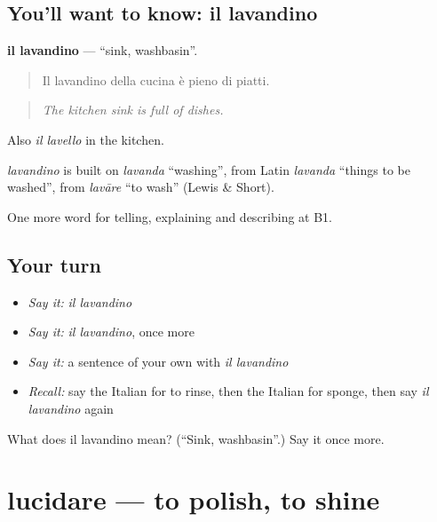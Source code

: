 \subsection*{You'll want to know: il lavandino}
\textbf{il lavandino} — \textquotedblleft{}sink, washbasin\textquotedblright{}.

\begin{quote}
Il lavandino della cucina è pieno di piatti.
\end{quote}

\begin{quote}
\emph{The kitchen sink is full of dishes.}
\end{quote}

Also \emph{il lavello} in the kitchen.

\begin{cousinweb}
\emph{lavandino} is built on \emph{lavanda} \textquotedblleft{}washing\textquotedblright{}, from Latin \emph{lavanda} \textquotedblleft{}things to be washed\textquotedblright{}, from \emph{lavāre} \textquotedblleft{}to wash\textquotedblright{} (Lewis \& Short).
\end{cousinweb}

\begin{grammarlens}[title={What you've built}]
One more word for telling, explaining and describing at B1.
\end{grammarlens}

\subsection*{Your turn}
\begin{itemize}
\raggedright
  \item \emph{Say it:} \emph{il lavandino}
  \item \emph{Say it:} \emph{il lavandino}, once more
  \item \emph{Say it:} a sentence of your own with \emph{il lavandino}
  \item \emph{Recall:} say the Italian for to rinse, then the Italian for sponge, then say \emph{il lavandino} again
\end{itemize}

\begin{tcolorbox}[breakable,colback=teal!4,colframe=teal!35!black,title={Before you move on}]
What does il lavandino mean? (\textquotedblleft{}Sink, washbasin\textquotedblright{}.) Say it once more.
\end{tcolorbox}
\section[lucidare]{lucidare — to polish, to shine}

